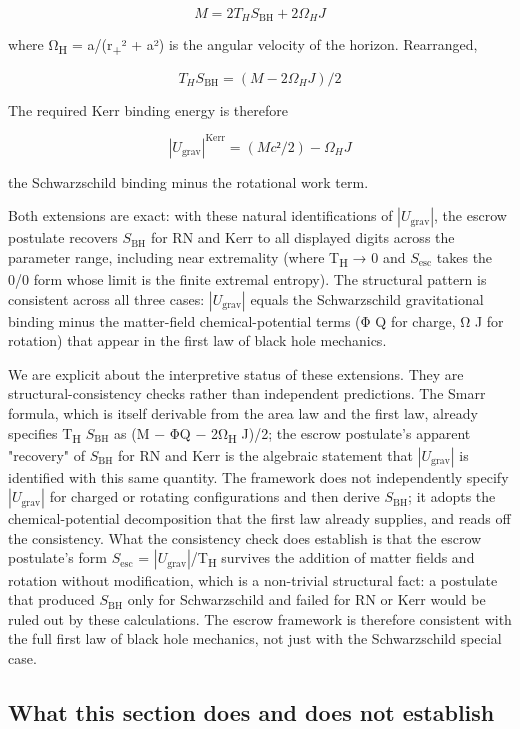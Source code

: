 \documentclass[11pt]{article}
\begin{document}
\[ M = 2T_H S_{\mathrm{BH}} + 2Ω_H J \]

where Ω\textsubscript{H} = a/(r\textsubscript{+}² + a²) is the angular velocity of the horizon.
Rearranged,

\[ T_H S_{\mathrm{BH}} = (M - 2Ω_H J)/2 \]

The required Kerr binding energy is therefore

\[ |U_{\mathrm{grav}}|^{\mathrm{Kerr}} = (Mc²/2) - Ω_H J \]

the Schwarzschild binding minus the rotational work term.

Both extensions are exact: with these natural identifications of
$|U_{\mathrm{grav}}|$, the escrow postulate recovers $S_{\mathrm{BH}}$ for RN and Kerr to all
displayed digits across the parameter range, including near extremality
(where T\textsubscript{H} → 0 and $S_{\mathrm{esc}}$ takes the 0/0 form whose limit is the finite
extremal entropy). The structural pattern is consistent across all three
cases: $|U_{\mathrm{grav}}|$ equals the Schwarzschild gravitational binding minus
the matter-field chemical-potential terms (Φ Q for charge, Ω J for
rotation) that appear in the first law of black hole mechanics.

We are explicit about the interpretive status of these extensions. They
are structural-consistency checks rather than independent predictions.
The Smarr formula, which is itself derivable from the area law and the
first law, already specifies T\textsubscript{H} $S_{\mathrm{BH}}$ as (M − ΦQ − 2Ω\textsubscript{H} J)/2; the escrow
postulate's apparent "recovery" of $S_{\mathrm{BH}}$ for RN and Kerr is the
algebraic statement that $|U_{\mathrm{grav}}|$ is identified with this same
quantity. The framework does not independently specify $|U_{\mathrm{grav}}|$ for
charged or rotating configurations and then derive $S_{\mathrm{BH}}$; it adopts the
chemical-potential decomposition that the first law already supplies,
and reads off the consistency. What the consistency check does establish
is that the escrow postulate's form $S_{\mathrm{esc}}$ = $|U_{\mathrm{grav}}|$/T\textsubscript{H} survives the
addition of matter fields and rotation without modification, which is a
non-trivial structural fact: a postulate that produced $S_{\mathrm{BH}}$ only for
Schwarzschild and failed for RN or Kerr would be ruled out by these
calculations. The escrow framework is therefore consistent with the full
first law of black hole mechanics, not just with the Schwarzschild
special case.


\subsection{What this section does and does not establish}
\end{document}
